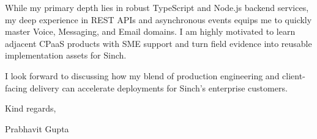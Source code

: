 \documentclass{article}
\newcommand{\lettercontent}[1]{#1\vspace{1ex}\par}
\newcommand{\closing}[1]{#1\vspace{2cm}\par}
\newcommand{\signature}[1]{#1}
\begin{document}
\lettercontent{While my primary depth lies in robust TypeScript and Node.js backend services, my deep experience in REST APIs and asynchronous events equips me to quickly master Voice, Messaging, and Email domains. I am highly motivated to learn adjacent CPaaS products with SME support and turn field evidence into reusable implementation assets for Sinch.}

\lettercontent{I look forward to discussing how my blend of production engineering and client-facing delivery can accelerate deployments for Sinch's enterprise customers.}

\begin{flushright}
\closing{Kind regards,}

\signature{Prabhavit Gupta}
\end{flushright}
\end{document}
